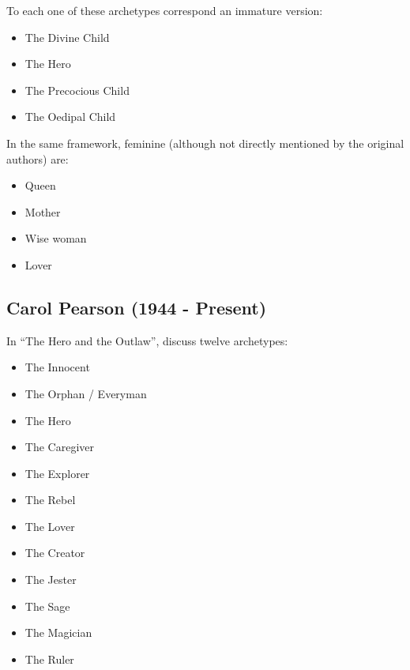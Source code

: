 \documentclass[
]{book}
\providecommand{\tightlist}{%
  \setlength{\itemsep}{0pt}\setlength{\parskip}{0pt}}
\begin{document}
To each one of these archetypes correspond an immature version:

\begin{itemize}
\tightlist
\item
  The Divine Child
\item
  The Hero
\item
  The Precocious Child
\item
  The Oedipal Child
\end{itemize}

In the same framework, feminine (although not directly mentioned by the original authors) are:

\begin{itemize}
\tightlist
\item
  Queen
\item
  Mother
\item
  Wise woman
\item
  Lover
\end{itemize}

\hypertarget{carol-pearson-1944---present}{%
\subsection{Carol Pearson (1944 - Present)}\label{carol-pearson-1944---present}}

In ``The Hero and the Outlaw'', \citet{mark2001hero} discuss twelve archetypes:

\begin{itemize}
\tightlist
\item
  The Innocent
\item
  The Orphan / Everyman
\item
  The Hero
\item
  The Caregiver
\item
  The Explorer
\item
  The Rebel
\item
  The Lover
\item
  The Creator
\item
  The Jester
\item
  The Sage
\item
  The Magician
\item
  The Ruler
\end{itemize}
\end{document}
